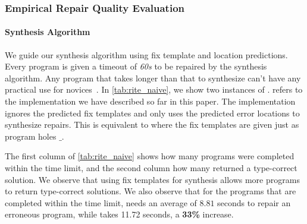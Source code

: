 

\subsubsection{Empirical Repair Quality Evaluation}
\label{subsec:eval:man_rep_qual_eval}

\paragraph{Synthesis Algorithm}
We guide our synthesis algorithm using fix template and location predictions.
Every program is given a timeout of \emph{60s} to be repaired by the synthesis
algorithm. Any program that takes longer than that to synthesize can't have any
practical use for novices~\cite{FIXME}. In \autoref{tab:rite_naive}, we show two
instances of \toolname. \toolname refers to the implementation we have described
so far in this paper. The \naive implementation ignores the predicted fix
templates and only uses the predicted error locations to synthesize repairs.
This is equivalent to \toolname where the fix templates are given just as program
holes $\_$.

The first column of \autoref{tab:rite_naive} shows how many programs were
completed within the time limit, and the second column how many returned a
type-correct solution. We observe that using fix templates for synthesis
allows more programs to return type-correct solutions. We also observe
that for the programs that are completed within the time limit, \toolname needs
an average of $8.81$ seconds to repair an erroneous program, while \naive takes
11.72 seconds, a \textbf{33\%} increase.

